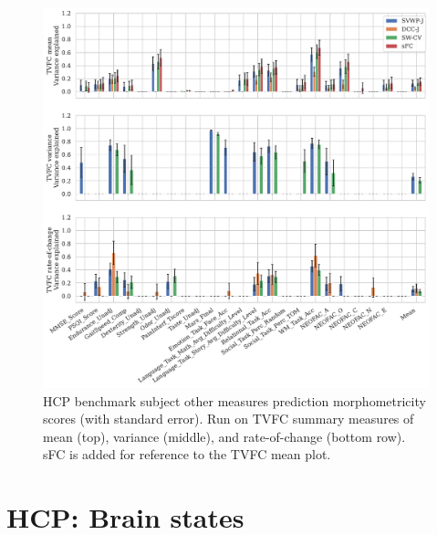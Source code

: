 \begin{figure}[h]
  \centering
  \includegraphics[width=\textwidth]{fig/hcp/d15/subject_measure_prediction/other/morphometricity_all_TVFC_summary_measures}
  \caption{
    HCP benchmark subject other measures prediction morphometricity scores (with standard error).
    Run on TVFC summary measures of mean (top), variance (middle), and rate-of-change (bottom row).
    sFC is added for reference to the TVFC mean plot.
  }\label{fig:results-subject-measures-prediction-other}
\end{figure}


\clearpage
\section{HCP: Brain states}\label{appendix:hcp-brain-states}


